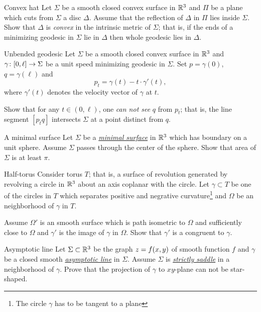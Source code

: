 \documentclass[twoside]{book}
\begin{document}
\begin{pr}{\easy}{Convex hat}\label{Convex hat}
Let $\Sigma$ be a smooth closed convex surface 
in $\mathbb{R}^3$ 
and $\Pi$ be a plane which cuts from $\Sigma$ a disc $\Delta$.
Assume that the reflection of $\Delta$ in $\Pi$ lies inside $\Sigma$.
Show that $\Delta$ is \emph{convex} in the intrinsic metric  of $\Sigma$;
that is, 
if the ends of a minimizing geodesic in $\Sigma$ 
lie in $\Delta$ then whole geodesic lies in $\Delta$.
\end{pr}

\begin{pr}{}{Unbended geodesic}\label{Unbended geodesic} %
Let $\Sigma$ be a smooth closed convex surface 
in $\mathbb{R}^3$ 
and $\gamma\:[0,\ell]\z\to \Sigma$ be a unit speed minimizing geodesic in $\Sigma$.
Set $p=\gamma(0)$, $q=\gamma(\ell)$ and 
$$p_t=\gamma(t)-t\cdot\gamma'(t),$$ 
where $\gamma'(t)$ denotes the velocity vector of $\gamma$ at $t$.

Show that for any $t\in (0,\ell)$,
one \emph{can not see}  $q$ from $p_t$;
that is, the line segment $[p_tq]$ intersects $\Sigma$ at a point distinct from $q$.
\end{pr}


\begin{pr}{}{A minimal surface}%
\label{min-surf}
Let $\Sigma$ be a \hyperref[Minimal surface]{\emph{minimal surface}} in $\mathbb{R}^3$ which has boundary on a unit sphere.
Assume $\Sigma$ passes through the center of the sphere.
Show that area of $\Sigma$ is at least $\pi$.
\end{pr}

\begin{pr}{\hard}{Half-torus}\label{half-torus}
Consider torus $T$;
that is, a surface of revolution generated by revolving a circle in $\mathbb{R}^3$ about an axis coplanar with the circle.
Let $\gamma\subset T$ be one of the circles in $T$ which separates positive and negrative curvature\footnote{The circle $\gamma$ has to be tangent to a plane}
and $\Omega$ be an neighborhood of $\gamma$ in $T$.


Assume $\Omega'$ is an smooth surface which is path isometric to $\Omega$ and sufficiently close to $\Omega$
and $\gamma'$ is the image of $\gamma$ in $\Omega$.
Show that $\gamma'$ is a congruent to $\gamma$.
\end{pr}



\begin{pr}{}{Asymptotic line}\label{asymptotic-line}
Let $\Sigma\subset \mathbb{R}^3$ be the graph $z\z=f(x,y)$
of smooth function $f$ 
and $\gamma$ be a closed smooth \hyperref[Asymptotic line]{\emph{asymptotic line}} in $\Sigma$.
Assume $\Sigma$ is \hyperref[Saddle surface]{\emph{strictly saddle}} in a neighborhood of $\gamma$.
Prove that the projection of $\gamma$ to $x y$-plane can not be star-shaped.
\end{pr}
\end{document}
